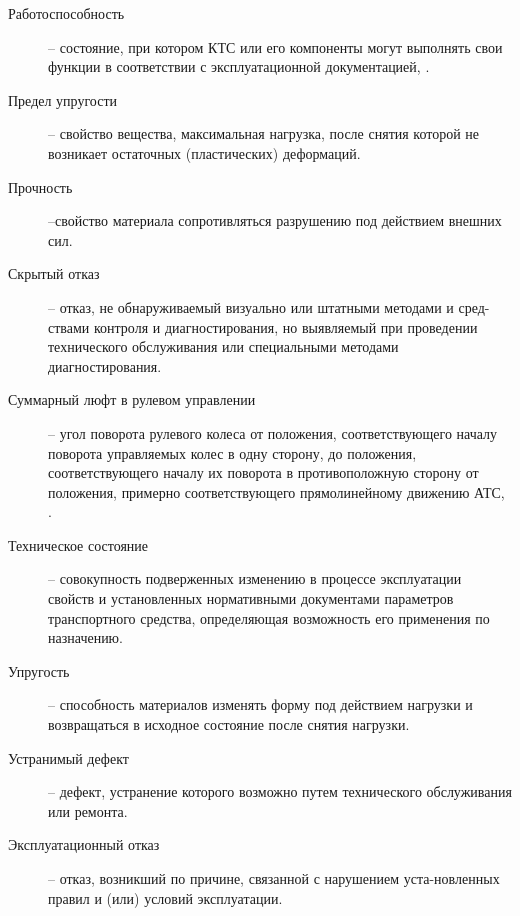 \begin{description}
\item
[Работоспособность] -- состояние, при котором КТС или его компоненты могут выполнять свои функции в соответствии с эксплуатационной документацией, \cite[п.2.49]{33997:gost}.
	\item
	[Предел упругости ] -- свойство вещества, максимальная нагрузка, после снятия которой не возникает остаточных (пластических) деформаций.
	\item
	[Прочность] --свойство материала сопротивляться разрушению под действием внешних сил.
	\item
	[Скрытый отказ] -- отказ, не обнаруживаемый визуально или штатными методами и сред-ствами контроля и диагностирования, но выявляемый при проведении технического обслуживания или специальными методами диагностирования.
	\item[Суммарный люфт в рулевом управлении] -- угол поворота рулевого колеса от положения, соответствующего началу поворота управляемых колес в одну сторону, до положения, соответствующего началу их поворота в противоположную сторону от положения, примерно соответствующего прямолинейному движению АТС, \cite[п.2.66 ]{33997:gost}.
	\item
	[Техническое состояние] --  совокупность подверженных изменению в процессе эксплуатации свойств и установленных нормативными документами параметров транспортного средства, определяющая возможность его применения по назначению.
	\item
	[Упругость] --  способность  материалов  изменять форму  под  действием  нагрузки  и  возвращаться  в исходное состояние после снятия нагрузки.
	\item
	[Устранимый дефект] -- дефект, устранение которого возможно путем технического
	обслуживания или ремонта.
	
	
	\item
	[Эксплуатационный отказ] -- отказ, возникший по причине, связанной с нарушением уста-новленных правил и (или) условий эксплуатации.
	

\end{description}
